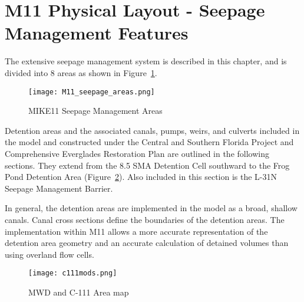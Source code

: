 \section{M11 Physical Layout - Seepage Management Features}
\label{sec:seepagefeatures}


The extensive seepage management system is described in this chapter, and is divided into 8 areas as shown in Figure~\ref{fig:M11_seepage_areas}.

\begin{figure}[!h]
  \begin{center}
  \texttt{[image: M11\_seepage\_areas.png]}
  \caption[MIKE11 Seepage Management Areas]{MIKE11 Seepage Management Areas}
  \label{fig:M11_seepage_areas}
  \end{center}
\end{figure}

\clearpage

Detention areas and the associated canals, pumps, weirs, and culverts included in the model and constructed under the Central and Southern Florida Project and Comprehensive Everglades Restoration Plan are outlined in the following sections. They extend from the 8.5 SMA Detention Cell southward to the Frog Pond Detention Area (Figure~\ref{fig:c111mods}). Also included in this section is the L-31N Seepage Management Barrier.

In general, the detention areas are implemented in the model as a broad, shallow canals.  Canal cross sections define the boundaries of the detention areas. The implementation within M11 allows a more accurate representation of the detention area geometry and an accurate calculation of detained volumes than using overland flow cells.

\begin{figure}[!h]
  \begin{center}
  \texttt{[image: c111mods.png]}
  \caption{MWD and C-111 Area map}
  \label{fig:c111mods}
  \end{center}
\end{figure}


\clearpage
